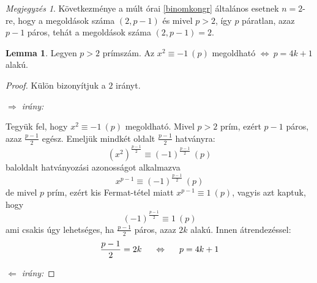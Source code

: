 \documentclass[12pt]{book}
\theoremstyle{plain} %
\theoremstyle{definition} %
\newtheorem{lem/}{Lemma}[section]
\newenvironment{lem}
  {\renewcommand{\qedsymbol}{$\clubsuit$}%
   \pushQED{\qed}\begin{lem/}}
  {\popQED\end{lem/}}
\theoremstyle{remark}
\newtheorem*{mj}{Megjegyzés}
\renewcommand\qedsymbol{$\blacksquare$}
\numberwithin{equation}{section}  %
\begin{document}
	\begin{mj}
		Következménye a múlt órai \ref{binomkongr} általános esetnek $n=2$-re, hogy a megoldások száma $(2,p-1)$ és mivel $p>2$, így $p$ páratlan, azaz $p-1$ páros, tehát a megoldások száma $(2,p-1)=2$.
	\end{mj}

	\begin{lem}\label{wilson_kov}
		Legyen $p>2$ prímszám. Az $x^2\equiv -1\ (p)$ megoldható $\Leftrightarrow\ p=4k+1$ alakú. 
	\end{lem}
	
	\begin{proof}
		Külön bizonyítjuk a $2$ irányt.
		
		\textit{$\Rightarrow$ irány:}
		
		Tegyük fel, hogy $x^2 \equiv -1\ (p)$ megoldható. Mivel $p>2$ prím, ezért $p-1$ páros, azaz $\frac{p-1}{2}$ egész. Emeljük mindkét oldalt $\frac{p-1}{2}$ hatványra:
		\[ (x^2)^{\frac{p-1}{2}} \equiv (-1)^{\frac{p-1}{2}}\ (p)  \]
		baloldalt hatványozási azonosságot alkalmazva
		\[ x^{p-1} \equiv  (-1)^{\frac{p-1}{2}}\ (p) \]
		de mivel $p$ prím, ezért kis Fermat-tétel miatt $x^{p-1}\equiv 1\ (p)$, vagyis azt kaptuk, hogy
		\[ (-1)^{\frac{p-1}{2}} \equiv 1\ (p)  \]
		ami csakis úgy lehetséges, ha $\frac{p-1}{2}$ páros, azaz $2k$ alakú. Innen átrendezéssel:
		\[ \dfrac{p-1}{2} = 2k \hspace{5mm} \Leftrightarrow \hspace{5mm} p = 4k+1  \]
		
		\textit{$\Leftarrow$ irány:}
		

\end{proof}
\end{document}
